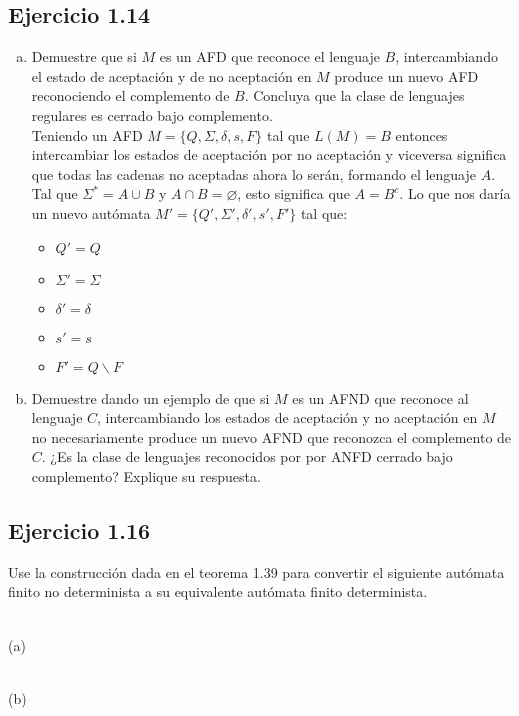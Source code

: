 \documentclass{article}
\begin{document}
\subsection*{Ejercicio 1.14}
\begin{enumerate}[a)]
    \item Demuestre que si $M$ es un AFD que reconoce el lenguaje $B$, intercambiando el estado de aceptación y de no aceptación en $M$ produce un nuevo AFD reconociendo el complemento de $B$. Concluya que la clase de lenguajes regulares es cerrado bajo complemento.\vspace{0.5em}\\
    Teniendo un AFD $M=\{Q,\Sigma,\delta,s,F\}$ tal que $L(M)=B$ entonces intercambiar los estados de aceptación por no aceptación y viceversa significa que todas las cadenas no aceptadas ahora lo serán, formando el lenguaje $A$. Tal que $\Sigma^*=A\cup B$ y $A\cap B=\varnothing$, esto significa que $A=B^c$. Lo que nos daría un nuevo autómata $M'=\{Q',\Sigma',\delta',s',F'\}$ tal que:
    \begin{itemize}
        \item $Q'=Q$
        \item $\Sigma'=\Sigma$
        \item $\delta'=\delta$
        \item $s'=s$
        \item $F'=Q\backslash F$
    \end{itemize}
    
    \item Demuestre dando un ejemplo de que si $M$ es un AFND que reconoce al lenguaje $C$, intercambiando los estados de aceptación y no aceptación en $M$ no necesariamente produce un nuevo AFND que reconozca el complemento de $C$. ¿Es la clase de lenguajes reconocidos por por ANFD cerrado bajo complemento? Explique su respuesta.\vspace{0.5em}\\
\end{enumerate}

\subsection*{Ejercicio 1.16}
Use la construcción dada en el teorema 1.39 para convertir el siguiente autómata finito no determinista a su equivalente autómata finito determinista.
\begin{multicols}{2}
\begin{center}
\\
(a)\phantom{M}
\end{center}

\begin{center}
\\
\phantom{Mx}(b)
\end{center}
\end{multicols}
\end{document}
